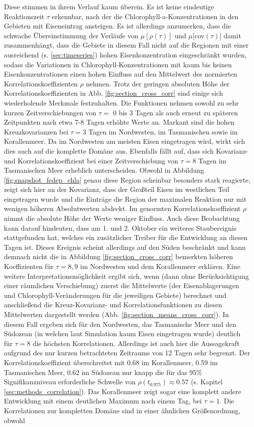 \documentclass[12pt,a4paper,onecolumn]{scrartcl}
\begin{document}
Diese stimmen in ihrem Verlauf kaum überein. Es ist keine eindeutige Reaktionszeit $\tau$ erkennbar, nach der die Chlorophyll-a-Konzentrationen in den Gebieten mit Eiseneintrag ansteigen. Es ist allerdings anzumerken, dass die schwache Übereinstimmung der Verläufe von $\mu[\rho(\tau)]$ und $\mu[$cov$(\tau)]$ damit zusammenhängt, dass die Gebiete in diesem Fall nicht auf die Regionen mit einer ausreichend (s. \ref{sec:timeseries}) hohen Eisenkonzentration eingeschränkt wurden, sodass die Variationen in Chlorophyll-Konzentrationen mit kaum bis keinen Eisenkonzentrationen einen hohen Einfluss auf den Mittelwert des normierten Korrelationskoeffizienten $\rho$ nehmen. Trotz der geringen absoluten Höhe der Korrelationskoeffizienten in Abb. \ref{fig:section_cross_corr} sind einige sich wiederholende Merkmale festzuhalten. Die Funktionen nehmen sowohl zu sehr kurzen Zeitverschiebungen von $\tau=$ 0 bis 3 Tagen als auch erneut zu späteren Zeitpunkten nach etwa 7-8 Tagen erhöhte Werte an. Markant sind die hohen Kreuzkovarianzen bei $\tau=3$ Tagen im Nordwesten, im Tasmanischen sowie im Korallenmeer. Da im Nordwesten am meisten Eisen eingetragen wird, wirkt sich dies auch auf die komplette Domäne aus. Ebenfalls fällt auf, dass sich Kovarianz- und Korrelationskoeffizient bei einer Zeitverschiebung von $\tau=8$ Tagen im Tasmanischen Meer erheblich unterscheiden. Obwohl in Abbildung \ref{fig:snapshot_fedep_chla} genau diese Region scheinbar besonders stark reagierte, zeigt sich hier an der Kovarianz, dass der Großteil Eisen im westlichen Teil eingetragen wurde und die Einträge die Region der maximalen Reaktion nur mit wenigen höheren Absolutwerten abdeckt. Im genormten Korrelationskoeffizient $\rho$ nimmt die absolute Höhe der Werte weniger Einfluss. Auch diese Beobachtung kann darauf hindeuten, dass am 1. und 2. Oktober ein weiteres Staubereignis stattgefunden hat, welches ein zusätzlicher Treiber für die Entwicklung an diesen Tagen ist. Dieses Ereignis scheint allerdings auf den Süden beschränkt und kann demnach nicht die in Abbildung \ref{fig:section_cross_corr} bemerkten höheren Koeffizienten für $\tau=8,9$ im Nordwesten und dem Korallenmeer erklären. Eine weitere Interpretationsmöglichkeit ergibt sich, wenn (dann ohne Berücksichtigung einer räumlichen Verschiebung) zuerst die Mittelwerte (der Eisenablagerungen und Chlorophyll-Veränderungen für die jeweiligen Gebiete) berechnet und anschließend die Kreuz-Kovarianz- und Korrelationsfunktionen zu diesen Mittelwerten dargestellt werden (Abb. \ref{fig:section_means_cross_corr}). In diesem Fall ergeben sich für den Nordwesten, das Tasmanische Meer und den Südozean (in welchen laut Simulation kaum Eisen eingetragen wurde) deutlich für $\tau=8$ die höchsten Korrelationen. Allerdings ist auch hier die Aussagekraft aufgrund des nur kurzen betrachteten Zeitraums von 12 Tagen sehr begrenzt. Der Korrelationskoeffizient überschreitet mit 0.68 im Korallenmeer, 0.59 im Tasmanischen Meer, 0.62 im Südozean nur knapp die für das 95\% Signifikanzniveau erforderliche Schwelle von $\rho(t_{0.975})\approx0.57$ (s. Kapitel \ref{sec:methods_correlation}). Das Korallenmeer zeigt sogar eine komplett andere Entwicklung mit einem deutlichen Maximum nach einem Tag, bei $\tau=1$. Die Korrelationen zur kompletten Domäne sind in einer ähnlichen Größenordnung, obwohl 
\end{document}
